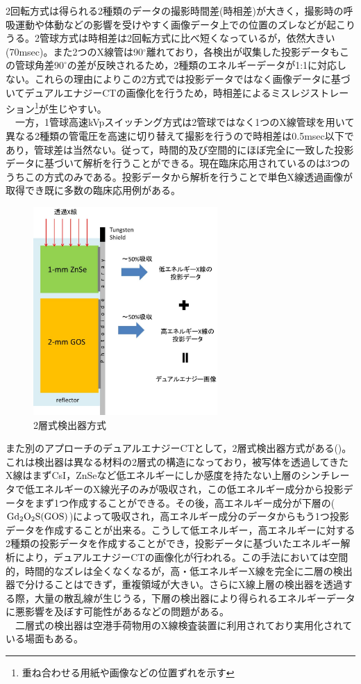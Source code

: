 2回転方式は得られる2種類のデータの撮影時間差(時相差)が大きく，撮影時の呼吸運動や体動などの影響を受けやすく画像データ上での位置のズレなどが起こりうる。2管球方式は時相差は2回転方式に比べ短くなっているが，依然大きい(70msec)。また2つのX線管は90$^{\circ}$離れており，各検出が収集した投影データもこの管球角差$90^{\circ}$の差が反映されるため，2種類のエネルギーデータが1:1に対応しない。これらの理由によりこの2方式では投影データではなく画像データに基づいてデュアルエナジーCTの画像化を行うため，時相差によるミスレジストレーション\footnote{重ね合わせる用紙や画像などの位置ずれを示す}が生じやすい。\\
\ \ 一方，1管球高速kVpスイッチング方式は2管球ではなく1つのX線管球を用いて異なる2種類の管電圧を高速に切り替えて撮影を行うので時相差は0.5msec以下であり，管球差は当然ない。従って，時間的及び空間的にほぼ完全に一致した投影データに基づいて解析を行うことができる。現在臨床応用されているのは3つのうちこの方式のみである。投影データから解析を行うことで単色X線透過画像が取得でき既に多数の臨床応用例がある\cite{spectralCT}。

\begin{figure}[H]
 \begin{center}
 \includegraphics[width=7cm]{image/other/two_layer.eps}
 \end{center}
 \caption{2層式検出器方式\cite{philips}}
 \label{fig:two_layer}
\end{figure}

また別のアプローチのデュアルエナジーCTとして，2層式検出器方式がある()。これは検出器は異なる材料の2層式の構造になっており，被写体を透過してきたX線はまずCsI，ZnSeなど低エネルギーにしか感度を持たない上層のシンチレータで低エネルギーのX線光子のみが吸収され，この低エネルギー成分から投影データをまず1つ作成することができる。その後，高エネルギー成分が下層の($\rm Gd_2O_2S(GOS)$)によって吸収され，高エネルギー成分のデータからもう1つ投影データを作成することが出来る。こうして低エネルギー，高エネルギーに対する2種類の投影データを作成することができ，投影データに基づいたエネルギー解析により，デュアルエナジーCTの画像化が行われる。この手法においては空間的，時間的なズレは全くなくなるが，高・低エネルギーX線を完全に二層の検出器で分けることはできず，重複領域が大きい。さらにX線上層の検出器を透過する際，大量の散乱線が生じうる，下層の検出器により得られるエネルギーデータに悪影響を及ぼす可能性があるなどの問題がある。\\\ \ 二層式の検出器は空港手荷物用のX線検査装置に利用されており実用化されている場面もある\cite{airport_1}\cite{airport_2}。

